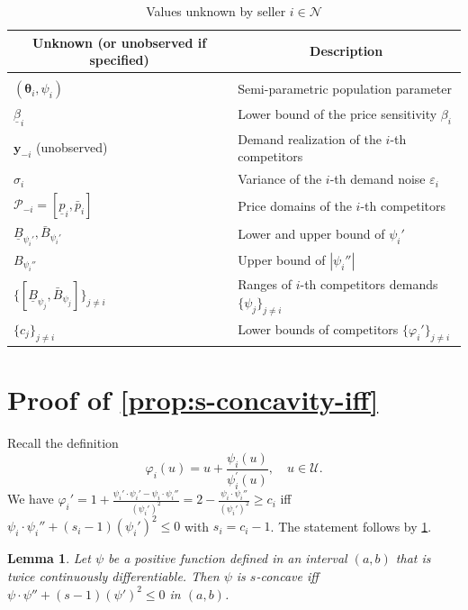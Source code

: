 \documentclass{article} %
\newtheorem{lemma}[theorem]{Lemma}
\begin{document}
\begin{table}[h]
\caption{Values unknown by seller $i \in \mathcal{N}$}
\begin{center}
\begin{tabular}{ll}
\multicolumn{1}{c}{\bf Unknown (or unobserved if specified)}  &\multicolumn{1}{c}{\bf Description}
\\ \hline \\
$(\boldsymbol{\theta}_i, \psi_i)$ & Semi-parametric population parameter\\
$\underline{\beta}_i$ & Lower bound of the price sensitivity $\beta_i$\\
$\boldsymbol{y}_{-i}$  (unobserved)       & Demand realization of the $i$-th competitors \\
$\sigma_i$        & Variance of the $i$-th demand noise $\varepsilon_i$ \\
$\mathcal{P}_{-i} = [\underline{p}_i,\bar{p}_i]$        & Price domains of the $i$-th competitors \\
$\underline{B}_{\psi_i'},\bar{B}_{\psi_i'}$ &  Lower and upper bound of $\psi_i'$\\
$B_{\psi_i''}$ & Upper bound of $|\psi_i''|$\\
$\{[\underline{B}_{\psi_j},\bar{B}_{\psi_j}]\}_{j\neq i}$                    & Ranges of $i$-th competitors demands $\{\psi_j\}_{j \neq i}$ \\
$\{c_j\}_{j \neq i}$                   & Lower bounds of competitors $\{\varphi_i'\}_{j \neq i}$ \\
\end{tabular}
\end{center}
\end{table}

\newpage

\section{Proof of \cref{prop:s-concavity-iff}}\label{app:s-concavity-iff}
Recall the definition 
$$
\varphi_i (u) =u + \frac{\psi_i(u)}{\psi_i^{\prime}(u)}, \quad u \in \mathcal{U}.
$$
We have $\varphi_i' = 1+\frac{\psi_i'\cdot\psi_i'-\psi_i \cdot \psi_i''}{(\psi_i')^2} = 2-\frac{\psi_i \cdot \psi_i''}{(\psi_i')^2} \geq c_{i}$ iff $\psi_i \cdot \psi_i''+(s_i-1)(\psi_i')^2 \leq 0$ with $s_i = c_{i}-1$. The statement follows by \cref{prop:alpha-concave}.

\begin{lemma}\label{prop:alpha-concave}
Let $\psi$ be a positive function defined in an interval $(a,b)$ that is twice continuously differentiable. Then $\psi$ is $s$-concave iff $\psi \cdot \psi'' + (s - 1) (\psi')^2 \leq 0$ in $(a,b)$.
\end{lemma}
\end{document}
